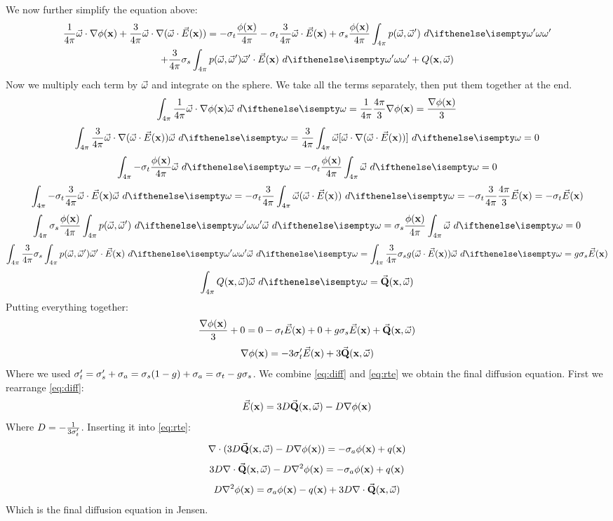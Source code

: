 \documentclass[10pt,a4paper]{article}
\begin{document}
We now further simplify the equation above:
\begin{multline*}
\frac{1}{4\pi} \omegavec \cdot \nablavec \xfunc{\phi} + \frac{3}{4\pi} \omegavec \cdot \nablavec (\omegavec \cdot \xvecfunc{E})
= -\extinction\frac{\xfunc{\phi}}{4\pi}  -\extinction\frac{3}{4\pi} \omegavec \cdot \xvecfunc{E} + \scattering \frac{\xfunc{\phi}}{4\pi} \sphere {p(\omegavec, \omegavec')}{\omega'}
 \\+ \frac{3}{4\pi} \scattering  \sphere {p(\omegavec, \omegavec')  \omegavec' \cdot \xvecfunc{E}}{\omega'}
 + \xomegafunc{Q} 
\end{multline*}
Now we multiply each term by $\vec{\omega}$ and integrate on the sphere. We take all the terms separately, then put them together at the end.
$$
\sphere{\frac{1}{4\pi} \omegavec \cdot \nablavec \xfunc{\phi}\omegavec}{} = \frac{1}{4\pi} \frac{4\pi}{3} \nablavec \xfunc{\phi} = \frac{\nablavec \xfunc{\phi}}{3}
$$
$$
\sphere{\frac{3}{4\pi} \omegavec \cdot \nablavec (\omegavec \cdot \xvecfunc{E}) \omegavec}{} = \frac{3}{4\pi} \sphere{\omegavec [\omegavec \cdot \nablavec (\omegavec \cdot \xvecfunc{E})] }{} = 0
$$
$$
\sphere{-\extinction\frac{\xfunc{\phi}}{4\pi} \omegavec}{} = -\extinction\frac{\xfunc{\phi}}{4\pi} \sphere{\omegavec}{} =  0
$$
$$
\sphere{-\extinction\frac{3}{4\pi} \omegavec \cdot \xvecfunc{E} \omegavec}{} = -\extinction \frac{3}{4\pi} \sphere{ \omegavec (\omegavec \cdot \xvecfunc{E})}{} = -\extinction\frac{3}{4\pi} \frac{4\pi}{3} \xvecfunc{E} = -\extinction \xvecfunc{E}
$$
$$
\sphere{\scattering \frac{\xfunc{\phi}}{4\pi} \sphere {p(\omegavec, \omegavec')}{\omega'} \omegavec}{} = \scattering \frac{\xfunc{\phi}}{4\pi} \sphere{\omegavec}{} = 0
$$
$$
\sphere{ \frac{3}{4\pi} \scattering  \sphere {p(\omegavec, \omegavec')  \omegavec' \cdot \xvecfunc{E}}{\omega'} \omegavec}{} = \sphere{ \frac{3}{4\pi} \scattering  g  (\omegavec \cdot \xvecfunc{E}) \omegavec}{} = g \scattering  \xvecfunc{E}
$$
$$
\sphere{ \xomegafunc{Q} \omegavec}{} =  \sourceonex 
$$
Putting everything together:
$$
\frac{{\nabla} {\phi}(\mathbf{x})}{3} + 0 = 0 -\sigma_t \vec{E}(\mathbf{x}) + 0 + g \sigma_s  \vec{E}(\mathbf{x}) + \vec{\mathbf{Q}}(\mathbf{x}, \vec{\omega}) 
$$
\begin{equation}
{\nabla} {\phi}(\mathbf{x}) = -3\sigma_t' \vec{E}(\mathbf{x}) + 3\vec{\mathbf{Q}}(\mathbf{x}, \vec{\omega}) 
\label{eq:diff}
\end{equation}
Where we used $\sigma_t' = \sigma_s' + \sigma_a = \sigma_s (1-g) + \sigma_a = \sigma_t -g \sigma_s$.
We combine \ref{eq:diff} and \ref{eq:rte} we obtain the final diffusion equation. First we rearrange \ref{eq:diff}:
$$
\vec{E}(\mathbf{x}) = 3 D \vec{\mathbf{Q}}(\mathbf{x}, \vec{\omega})  - D {\nabla} {\phi}(\mathbf{x})
$$
Where $D = -\frac{1}{3 \sigma_t'}$. Inserting it into \ref{eq:rte}:
$$
{\nabla} \cdot (3 D \vec{\mathbf{Q}}(\mathbf{x}, \vec{\omega})  - D {\nabla} {\phi}(\mathbf{x})) = -\sigma_a  {\phi}(\mathbf{x}) + {q}(\mathbf{x})
$$
$$
3 D {\nabla} \cdot \vec{\mathbf{Q}}(\mathbf{x}, \vec{\omega}) - D \nabla^2 {\phi}(\mathbf{x}) =  -\sigma_a  {\phi}(\mathbf{x}) + {q}(\mathbf{x})
$$
$$
D \nabla^2 {\phi}(\mathbf{x}) = \sigma_a {\phi}(\mathbf{x}) - {q}(\mathbf{x}) + 3 D {\nabla} \cdot \vec{\mathbf{Q}}(\mathbf{x}, \vec{\omega})
$$
Which is the final diffusion equation in Jensen.
\end{document}
